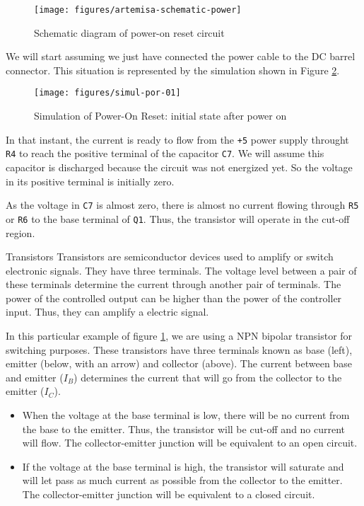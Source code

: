\begin{figure}[htbp]
  \centering
  \texttt{[image: figures/artemisa-schematic-power]}
  \caption{Schematic diagram of power-on reset circuit}
  \label{fig:artemisa-schematic-por}
\end{figure}

We will start assuming we just have connected the power cable to the DC barrel connector. This situation is represented by the simulation shown in Figure \ref{fig:simul-por-01}.

\begin{figure}[htb]
  \centering
  \texttt{[image: figures/simul-por-01]}
  \caption{Simulation of Power-On Reset: initial state after power on}
  \label{fig:simul-por-01}
\end{figure}

In that instant, the current is ready to flow from the {\tt +5} power supply throught {\tt R4} to reach the positive terminal of the capacitor {\tt C7}. We will assume this capacitor is discharged because the circuit was not energized yet. So the voltage in its positive terminal is initially zero.

As the voltage in {\tt C7} is almost zero, there is almost no current flowing through {\tt R5} or {\tt R6} to the base terminal of  {\tt Q1}. Thus, the transistor will operate in the cut-off region.

\begin{theory}{Transistors}
  Transistors are semiconductor devices used to amplify or switch electronic signals. They have three terminals. The voltage level between a pair of these terminals determine the current through another pair of terminals. The power of the controlled output can be higher than the power of the controller input. Thus, they can amplify a electric signal.

  In this particular example of figure \ref{fig:artemisa-schematic-por}, we are using a NPN bipolar transistor for switching purposes. These transistors have three terminals known as base (left), emitter (below, with an arrow) and collector (above). The current between base and emitter ($I_B$) determines the current that will go from the collector to the emitter ($I_C$).

  \begin{itemize}
    \item When the voltage at the base terminal is low, there will be no current from the base to the emitter. Thus, the transistor will be cut-off and no current will flow. The collector-emitter junction will be equivalent to an open circuit.
    \item If the voltage at the base terminal is high, the transistor will saturate and will let pass as much current as possible from the collector to the emitter. The collector-emitter junction will be equivalent to a closed circuit.
  \end{itemize}
\end{theory}

